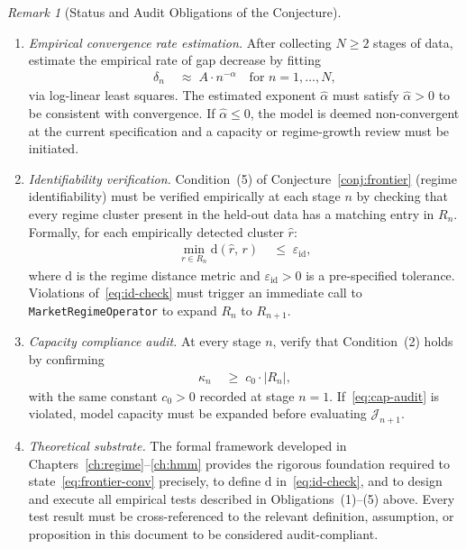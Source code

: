 \documentclass[12pt,openany]{book}
\numberwithin{equation}{chapter}
\theoremstyle{plain}
\theoremstyle{definition}
\theoremstyle{remark}
\newtheorem{remark}[theorem]{Remark}
\numberwithin{equation}{chapter}
\theoremstyle{plain}
\newcommand{\calR}{\mathcal{R}}
\def\calR{R}%
\begin{document}
\begin{remark}[Status and Audit Obligations of the Conjecture]
\begin{enumerate}
  \item \emph{Empirical convergence rate estimation.}
        After collecting $N \geq 2$ stages of data,
        estimate the empirical rate of gap decrease by
        fitting
        \begin{align}
          \delta_n
          &\;\approx\;
          A \cdot n^{-\alpha}
          \quad \text{for } n = 1, \ldots, N,
          \label{eq:rate-fit}
        \end{align}
        via log-linear least squares.
        The estimated exponent $\hat{\alpha}$ must satisfy
        $\hat{\alpha} > 0$ to be consistent with
        convergence.
        If $\hat{\alpha} \leq 0$, the model is deemed
        non-convergent at the current specification and
        a capacity or regime-growth review must be
        initiated.

  \item \emph{Identifiability verification.}
        Condition~(5) of Conjecture~\ref{conj:frontier}
        (regime identifiability) must be verified
        empirically at each stage $n$ by checking that
        every regime cluster present in the held-out
        data has a matching entry in $\calR_n$.
        Formally, for each empirically detected cluster
        $\hat{r}$:
        \begin{align}
          \min_{r \in \calR_n}
          \mathrm{d}(\hat{r},\, r)
          &\;\leq\;
          \varepsilon_{\mathrm{id}},
          \label{eq:id-check}
        \end{align}
        where $\mathrm{d}$ is the regime distance metric
        and $\varepsilon_{\mathrm{id}} > 0$ is a
        pre-specified tolerance.
        Violations of~\eqref{eq:id-check} must trigger
        an immediate call to
        \texttt{MarketRegimeOperator} to expand
        $\calR_n$ to $\calR_{n+1}$.

  \item \emph{Capacity compliance audit.}
        At every stage $n$, verify that
        Condition~(2) holds by confirming
        \begin{align}
          \kappa_n
          &\;\geq\;
          c_0 \cdot |\calR_n|,
          \label{eq:cap-audit}
        \end{align}
        with the same constant $c_0 > 0$ recorded at
        stage $n = 1$.
        If~\eqref{eq:cap-audit} is violated,
        model capacity must be expanded before
        evaluating $\mathcal{J}_{n+1}$.

  \item \emph{Theoretical substrate.}
        The formal framework developed in
        Chapters~\ref{ch:regime}--\ref{ch:hmm}
        provides the rigorous foundation required to
        state~\eqref{eq:frontier-conv} precisely, to
        define $\mathrm{d}$ in~\eqref{eq:id-check},
        and to design and execute all empirical tests
        described in Obligations~(1)--(5) above.
        Every test result must be cross-referenced to
        the relevant definition, assumption, or
        proposition in this document to be considered
        audit-compliant.
\end{enumerate}
\end{remark}
\end{document}
